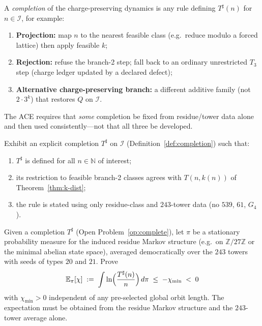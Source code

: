 \begin{definition}
\label{def:completion}
A \emph{completion} of the charge-preserving dynamics is any rule defining
\(T^\sharp(n)\) for \(n\in\mathcal{I}\), for example:
\begin{enumerate}[label=(\roman*)]
  \item \textbf{Projection:} map \(n\) to the nearest feasible class
        (e.g.\ reduce modulo a forced lattice) then apply feasible \(k\);
  \item \textbf{Rejection:} refuse the branch-2 step; fall back to an ordinary
        unrestricted \(T_3\) step (charge ledger updated by a declared defect);
  \item \textbf{Alternative charge-preserving branch:} a different additive
        family (not \(2\cdot 3^{k}\)) that restores \(Q\) on \(\mathcal{I}\).
\end{enumerate}
The ACE requires that \emph{some} completion be fixed from residue/tower data
alone and then used consistently---not that all three be developed.
\end{definition}

\begin{openproblem}
\label{op:complete}
Exhibit an explicit completion \(T^\sharp\) on \(\mathcal{I}\)
(Definition~\ref{def:completion}) such that:
\begin{enumerate}[label=(\roman*)]
  \item \(T^\sharp\) is defined for all \(n\in\mathbb{N}\) of interest;
  \item its restriction to feasible branch-2 classes agrees with
        \(T(n,k(n))\) of Theorem~\ref{thm:k-dist};
  \item the rule is stated using only residue-class and \(243\)-tower data
        (no \(539\), \(61\), \(G_4\)).
\end{enumerate}
\end{openproblem}

\begin{openproblem}
\label{op:ACE}
Given a completion \(T^\sharp\) (Open Problem~\ref{op:complete}), let \(\pi\) be
a stationary probability measure for the induced residue Markov structure
(e.g.\ on \(\mathbb{Z}/27\mathbb{Z}\) or the minimal abelian state space),
averaged democratically over the \(243\) towers with seeds of types \(20\) and
\(21\). Prove
\begin{equation}
\label{eq:open-ACE}
\mathbb{E}_\pi[\chi]
\;:=\;
\int \ln\Bigl(\frac{T^\sharp(n)}{n}\Bigr)\,d\pi
\;\le\;
-\chi_{\min}
\;<\;0
\end{equation}
with \(\chi_{\min}>0\) independent of any pre-selected global orbit length.
The expectation must be obtained from the residue Markov structure and the
\(243\)-tower average alone.
\end{openproblem}

